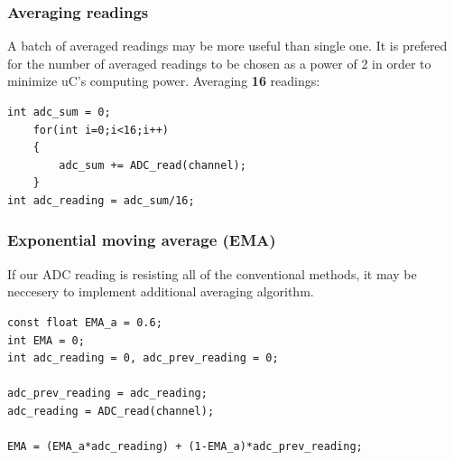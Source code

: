 \documentclass{article}
\begin{document}
\subsubsection{Averaging readings}
A batch of averaged readings may be more useful than single one. It is prefered for the number of averaged readings to be chosen as a power of 2 in order to minimize uC's computing power. Averaging \textbf{16} readings:
\begin{verbatim}
int adc_sum = 0;
	for(int i=0;i<16;i++)
	{
		adc_sum += ADC_read(channel);
	}
int adc_reading = adc_sum/16;
\end{verbatim}

\subsubsection{Exponential moving average (EMA)}	%
If our ADC reading is resisting all of the conventional methods, it may be neccesery to implement additional averaging algorithm. 
\begin{verbatim}
const float EMA_a = 0.6;
int EMA = 0;
int adc_reading = 0, adc_prev_reading = 0;

adc_prev_reading = adc_reading;
adc_reading = ADC_read(channel);

EMA = (EMA_a*adc_reading) + (1-EMA_a)*adc_prev_reading;
\end{verbatim}
\end{document}
